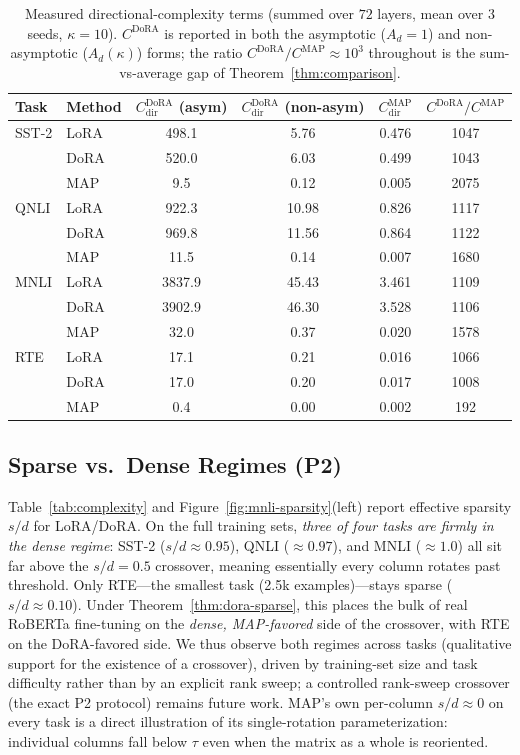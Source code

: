 \documentclass[11pt]{article}
\begin{document}
\begin{table}[t]
\centering
\caption{Measured directional-complexity terms (summed over $72$ layers, mean over
$3$ seeds, $\kappa=10$). $C^{\mathrm{DoRA}}$ is reported in both the asymptotic
($A_d\!=\!1$) and non-asymptotic ($A_d(\kappa)$) forms; the ratio
$C^{\mathrm{DoRA}}/C^{\mathrm{MAP}}\approx10^3$ throughout is the sum-vs-average gap of
Theorem~\ref{thm:comparison}.}
\label{tab:cterms}
\small
\begin{tabular}{llcccc}
\toprule
Task & Method & $C^{\mathrm{DoRA}}_{\mathrm{dir}}$ (asym) & $C^{\mathrm{DoRA}}_{\mathrm{dir}}$ (non-asym) & $C^{\mathrm{MAP}}_{\mathrm{dir}}$ & $C^{\mathrm{DoRA}}/C^{\mathrm{MAP}}$ \\
\midrule
SST-2 & LoRA & 498.1  & 5.76  & 0.476 & 1047 \\
      & DoRA & 520.0  & 6.03  & 0.499 & 1043 \\
      & MAP  &   9.5  & 0.12  & 0.005 & 2075 \\
\midrule
QNLI  & LoRA & 922.3  & 10.98 & 0.826 & 1117 \\
      & DoRA & 969.8  & 11.56 & 0.864 & 1122 \\
      & MAP  &  11.5  & 0.14  & 0.007 & 1680 \\
\midrule
MNLI  & LoRA & 3837.9 & 45.43 & 3.461 & 1109 \\
      & DoRA & 3902.9 & 46.30 & 3.528 & 1106 \\
      & MAP  &  32.0  & 0.37  & 0.020 & 1578 \\
\midrule
RTE   & LoRA &  17.1  & 0.21  & 0.016 & 1066 \\
      & DoRA &  17.0  & 0.20  & 0.017 & 1008 \\
      & MAP  &   0.4  & 0.00  & 0.002 &  192 \\
\bottomrule
\end{tabular}
\end{table}

\subsection{Sparse vs.\ Dense Regimes (P2)}
Table~\ref{tab:complexity} and Figure~\ref{fig:mnli-sparsity}(left) report effective
sparsity $s/d$ for LoRA/DoRA. On the full training sets, \emph{three of four tasks
are firmly in the dense regime}: SST-2 ($s/d\approx0.95$), QNLI ($\approx0.97$), and
MNLI ($\approx1.0$) all sit far above the $s/d=0.5$ crossover, meaning essentially
every column rotates past threshold. Only RTE---the smallest task (2.5k
examples)---stays sparse ($s/d\approx0.10$). Under Theorem~\ref{thm:dora-sparse}, this
places the bulk of real RoBERTa fine-tuning on the \emph{dense, MAP-favored} side of
the crossover, with RTE on the DoRA-favored side. We thus observe both regimes across
tasks (qualitative support for the existence of a crossover), driven by training-set
size and task difficulty rather than by an explicit rank sweep; a controlled
rank-sweep crossover (the exact P2 protocol) remains future work. MAP's own per-column
$s/d\approx0$ on every task is a direct illustration of its single-rotation
parameterization: individual columns fall below $\tau$ even when the matrix as a whole
is reoriented.
\end{document}
